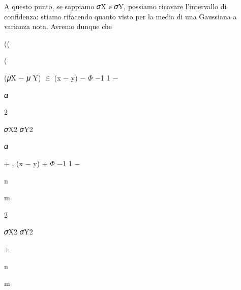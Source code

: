 \documentclass[a4paper,portrait,12pt]{article}
\begin{document}
\begin{flushleft}
A questo punto, se sappiamo 𝜎X e 𝜎Y, possiamo ricavare l'intervallo di confidenza: stiamo rifacendo quanto visto per la media di una Gaussiana a varianza nota. Avremo dunque che
\end{flushleft}





((


(





\begin{flushleft}
(𝜇X $-$ 𝜇 Y) $\in$ (x $-$ y) $-$ $\Phi$ $-$1 1 $-$
\end{flushleft}





\begin{flushleft}
𝛼
\end{flushleft}


2





\begin{flushleft}
𝜎X2 𝜎Y2
\end{flushleft}


\begin{flushleft}
𝛼
\end{flushleft}


\begin{flushleft}
+ , (x $-$ y) + $\Phi$ $-$1 1 $-$
\end{flushleft}


\begin{flushleft}
n
\end{flushleft}


\begin{flushleft}
m
\end{flushleft}


2





\begin{flushleft}
𝜎X2 𝜎Y2
\end{flushleft}


+


\begin{flushleft}
n
\end{flushleft}


\begin{flushleft}
m
\end{flushleft}
\end{document}
